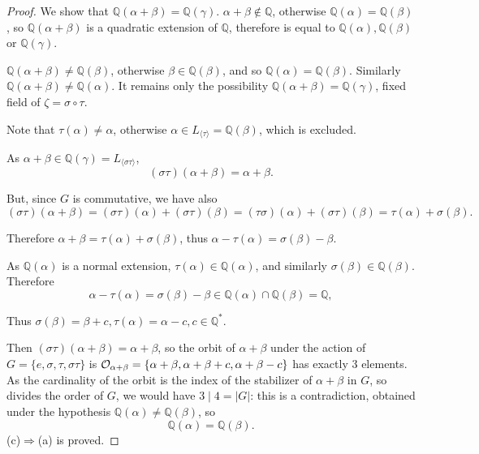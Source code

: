 \documentclass[11pt,a4paper]{article}
\newcommand{\Q}{\mathbb{Q}}
\begin{document}
\begin{proof}
\bigskip


\bigskip

We show that $\Q(\alpha+\beta) = \Q(\gamma)$. $\alpha + \beta \not \in \Q$, otherwise $\Q(\alpha) = \Q(\beta)$, so $\Q(\alpha+\beta)$ is a quadratic extension of $\Q$, therefore  is equal to $\Q(\alpha), \Q(\beta)$ or $\Q(\gamma)$.

$\Q(\alpha+\beta) \ne \Q(\beta)$, otherwise $\beta \in \Q(\beta)$, and so $\Q(\alpha) = \Q(\beta)$. Similarly $\Q(\alpha+\beta) \ne \Q(\alpha)$.
It remains only the possibility $\Q(\alpha+ \beta) = \Q(\gamma)$, fixed field of $\zeta = \sigma \circ \tau$.

Note that $\tau(\alpha) \neq \alpha$, otherwise $\alpha \in L_{\langle \tau \rangle} = \Q(\beta)$, which is excluded. 

As $\alpha + \beta \in \Q(\gamma) = L_{\langle \sigma \tau \rangle}$, $$(\sigma \tau)(\alpha + \beta) = \alpha + \beta.$$

But, since $G$ is commutative, we have also $$(\sigma \tau)(\alpha + \beta) = (\sigma \tau)(\alpha) + (\sigma \tau)(\beta )=( \tau \sigma)(\alpha) + (\sigma \tau)(\beta ) = \tau(\alpha)+ \sigma(\beta).$$

Therefore $\alpha+ \beta = \tau(\alpha) + \sigma(\beta)$, thus $\alpha - \tau(\alpha) = \sigma(\beta) - \beta$.

As $\Q(\alpha)$ is a normal extension, $\tau(\alpha) \in \Q(\alpha)$, and similarly $\sigma(\beta) \in \Q(\beta)$. Therefore
$$\alpha - \tau(\alpha) = \sigma(\beta) - \beta \in \Q(\alpha) \cap \Q(\beta) = \Q, $$

Thus $\sigma(\beta) = \beta+c, \tau(\alpha) = \alpha-c, c\in \Q^*$.

Then $(\sigma\tau)(\alpha+ \beta) = \alpha+\beta$, so the orbit of $\alpha + \beta$ under the action of $G = \{e,\sigma, \tau, \sigma \tau\}$ is ${\cal O}_{\alpha+\beta} =\{ \alpha+\beta, \alpha+\beta+c,\alpha+\beta-c\}$ has exactly 3 elements. As the cardinality of the orbit is the index of the stabilizer of $\alpha+ \beta$ in $G$, so divides the order of $G$, we would have $3 \mid 4 = \vert G \vert$: this is a contradiction, obtained under the hypothesis $\Q(\alpha) \neq \Q(\beta)$, so
$$\Q(\alpha) = \Q(\beta).$$
(c)$\Rightarrow$(a) is proved.


\end{proof}
\end{document}
